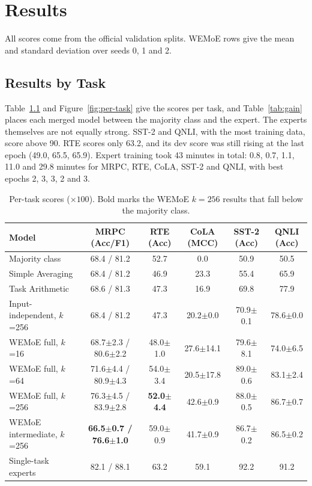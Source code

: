 \chapter{Results}
\label{ch:results}

All scores come from the official validation splits. WEMoE rows give the mean and standard deviation over seeds 0, 1 and 2.

\section{Results by Task}

Table~\ref{tab:per-task} and Figure~\ref{fig:per-task} give the scores per task, and Table~\ref{tab:gain} places each merged model between the majority class and the expert. The experts themselves are not equally strong. SST-2 and QNLI, with the most training data, score above 90. RTE scores only 63.2, and its dev score was still rising at the last epoch (49.0, 65.5, 65.9). Expert training took 43 minutes in total: 0.8, 0.7, 1.1, 11.0 and 29.8 minutes for MRPC, RTE, CoLA, SST-2 and QNLI, with best epochs 2, 3, 3, 2 and 3.

\begin{table}[htbp]
  \centering\tablestyle
  \caption{Per-task scores ($\times100$). Bold marks the WEMoE $k=256$ results that fall below the majority class.}
  \label{tab:per-task}
  \setlength{\tabcolsep}{3pt}\begin{tabular}{l c c c c c}
    \toprule
    Model & MRPC (Acc/F1) & RTE (Acc) & CoLA (MCC) & SST-2 (Acc) & QNLI (Acc)\\
    \midrule
    Majority class & 68.4 / 81.2 & 52.7 & 0.0 & 50.9 & 50.5\\
    Simple Averaging & 68.4 / 81.2 & 46.9 & 23.3 & 55.4 & 65.9\\
    Task Arithmetic & 68.6 / 81.3 & 47.3 & 16.9 & 69.8 & 77.9\\
    Input-independent, $k$=256 & 68.4 / 81.2 & 47.3 & 20.2$\pm$0.0 & 70.9$\pm$0.1 & 78.6$\pm$0.0\\
    WEMoE full, $k$=16 & 68.7$\pm$2.3 / 80.6$\pm$2.2 & 48.0$\pm$1.0 & 27.6$\pm$14.1 & 79.6$\pm$8.1 & 74.0$\pm$6.5\\
    WEMoE full, $k$=64 & 71.6$\pm$4.4 / 80.9$\pm$4.3 & 54.0$\pm$3.4 & 20.5$\pm$17.8 & 89.0$\pm$0.6 & 83.1$\pm$2.4\\
    WEMoE full, $k$=256 & 76.3$\pm$4.5 / 83.9$\pm$2.8 & \textbf{52.0$\pm$4.4} & 42.6$\pm$0.9 & 88.0$\pm$0.5 & 86.7$\pm$0.7\\
    WEMoE intermediate, $k$=256 & \textbf{66.5$\pm$0.7 / 76.6$\pm$1.0} & 59.0$\pm$0.9 & 41.7$\pm$0.9 & 86.7$\pm$0.2 & 86.5$\pm$0.2\\
    Single-task experts & 82.1 / 88.1 & 63.2 & 59.1 & 92.2 & 91.2\\
    \bottomrule
  \end{tabular}
\end{table}

